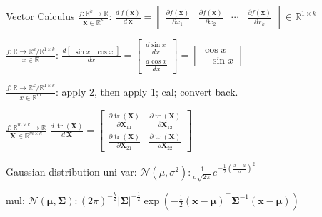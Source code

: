 \documentclass[UTF8,a4paper]{article}
\begin{document}
\begin{cheatsheetblock}{Vector Calculus}
    $\frac{f: \mathbb{R}^k \rightarrow \mathbb{R}}{\bm{x} \in \mathbb{R}^k}$: \hfill
    $\frac{d\,f(\bm{x})}{d\,\bm{x}}=\left[\begin{array}{cccc}
                \frac{\partial f(\bm{x})}{\partial x_1} & \frac{\partial f(\bm{x})}{\partial x_2} & \cdots & \frac{\partial f(\bm{x})}{\partial x_k}
            \end{array}\right] \in \mathbb{R}^{1 \times k}$

    $\frac{f: \mathbb{R} \rightarrow \mathbb{R}^k / \mathbb{R}^{1 \times k}}{x \in \mathbb{R}}$: \hfill
    $\frac{d\left[\begin{array}{ll}
                    \sin x & \cos x
                \end{array}\right]}{d x}=\left[\begin{array}{l}
                \frac{d \sin x}{d x} \\
                \frac{d \cos x}{d x}
            \end{array}\right]=\left[\begin{array}{c}
                \cos x \\
                -\sin x
            \end{array}\right]$

    $\frac{f: \mathbb{R} \rightarrow \mathbb{R}^k / \mathbb{R}^{1 \times k}}{x \in \mathbb{R}^m}$: \hfill
    apply 2, then apply 1; cal; convert back.

    $\frac{f: \mathbb{R}^{m \times k} \rightarrow \mathbb{R}}{\bm{X} \in \mathbb{R}^{m \times k}}$ \hfill
    $\frac{d\, \operatorname{tr}(\bm{X})}{d\, \bm{X}} = \begin{bmatrix}
            \frac{\partial \operatorname{tr} (\bm{X})}{\partial \bm{X}_{11}} & \frac{\partial \operatorname{tr} (\bm{X})}{\partial \bm{X}_{12}} \\
            \frac{\partial \operatorname{tr} (\bm{X})}{\partial \bm{X}_{21}} & \frac{\partial \operatorname{tr} (\bm{X})}{\partial \bm{X}_{22}}
        \end{bmatrix}$
\end{cheatsheetblock}

\begin{cheatsheetblock}{Gaussian distribution}
    uni var: \hfill $\mathcal{N}\left(\mu, \sigma^2\right): \frac{1}{\sigma \sqrt{2 \pi}} e^{-\frac{1}{2}\left(\frac{x-\mu}{\sigma}\right)^2}$

    mul: \hfill $\mathcal{N}\left(\boldsymbol{\mu}, \boldsymbol{\Sigma}\right): (2\pi)^{-\frac{k}{2}}|\boldsymbol{\Sigma}|^{-\frac{1}{2}} \exp \left(-\frac{1}{2}(\boldsymbol{x}-\boldsymbol{\mu})^{\top} \boldsymbol{\Sigma}^{-1}(\boldsymbol{x}-\boldsymbol{\mu})\right)$
\end{cheatsheetblock}
\end{document}
